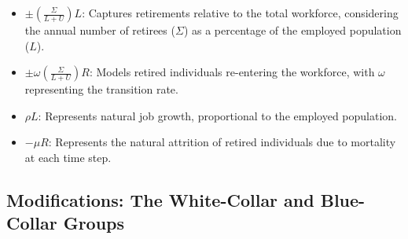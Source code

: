 \documentclass[11pt]{amsart}
\begin{document}
    


\begin{itemize}
    \item $\pm\left(\frac{\Sigma}{L + U}\right) L$: Captures retirements relative to the total workforce, considering the annual number of retirees ($\Sigma$) as a percentage of the employed population ($L$).

    \item $\pm \omega\left(\frac{\Sigma}{L + U}\right) R$: Models retired individuals re-entering the workforce, with $\omega$ representing the transition rate.

    \item $\rho L$: Represents natural job growth, proportional to the employed population.

    \item $-\mu R$: Represents the natural attrition of retired individuals due to mortality at each time step.
\end{itemize}



\subsection{Modifications: The White-Collar and Blue-Collar Groups}
\end{document}
